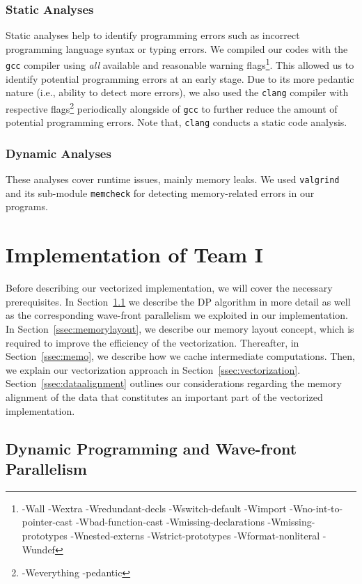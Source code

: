 \documentclass[runningheads,a4paper]{llncs}
\begin{document}
\subsubsection{Static Analyses}
Static analyses help to identify programming errors such as incorrect programming language syntax or typing errors.
We compiled our codes with the \texttt{gcc} compiler using {\em all} available and reasonable warning
flags\footnote{-Wall -Wextra -Wredundant-decls -Wswitch-default -Wimport -Wno-int-to-pointer-cast -Wbad-function-cast -Wmissing-declarations
-Wmissing-prototypes -Wnested-externs -Wstrict-prototypes -Wformat-nonliteral -Wundef}.
This allowed us to identify potential programming errors at an early stage.
Due to its more pedantic nature (i.e., ability to detect more errors), we also used the \texttt{clang} compiler with respective flags\footnote{-Weverything -pedantic}
periodically alongside of \texttt{gcc} to further reduce the amount of potential programming errors. Note that, \texttt{clang} conducts a static code analysis.

\subsubsection{Dynamic Analyses}
These analyses cover runtime issues, mainly memory leaks.
We used \texttt{valgrind} and its sub-module \texttt{memcheck} for detecting memory-related errors in our programs.


\section{Implementation of Team I}
\label{sec:implementation-1}

Before describing our vectorized implementation, we will cover the necessary prerequisites.
In Section~\ref{ssec:dynprogramming} we describe the DP algorithm in more detail as well as the corresponding wave-front parallelism we exploited in our implementation.
In Section~\ref{ssec:memorylayout}, we describe our memory layout concept, which is required to improve the efficiency of the vectorization.
Thereafter, in Section~\ref{ssec:memo}, we describe how we cache intermediate computations. Then, we explain our vectorization approach in Section~\ref{ssec:vectorization}.
Section~\ref{ssec:dataalignment} outlines our considerations regarding the memory alignment of the data that constitutes an important part of the vectorized implementation.

\subsection{Dynamic Programming and Wave-front Parallelism}
\label{ssec:dynprogramming}
\end{document}
